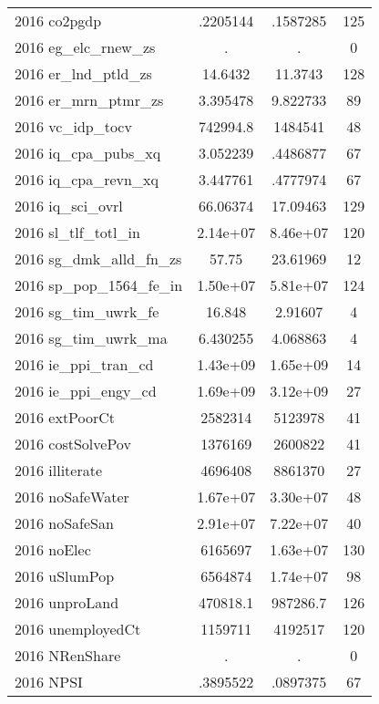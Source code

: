{\begin{tabular}{l*{1}{ccc}}
2016 co2pgdp        &    .2205144&    .1587285&         125\\
2016 eg\_elc\_rnew\_zs &           .&           .&           0\\
2016 er\_lnd\_ptld\_zs &     14.6432&     11.3743&         128\\
2016 er\_mrn\_ptmr\_zs &    3.395478&    9.822733&          89\\
2016 vc\_idp\_tocv    &    742994.8&     1484541&          48\\
2016 iq\_cpa\_pubs\_xq &    3.052239&    .4486877&          67\\
2016 iq\_cpa\_revn\_xq &    3.447761&    .4777974&          67\\
2016 iq\_sci\_ovrl    &    66.06374&    17.09463&         129\\
2016 sl\_tlf\_totl\_in &    2.14e+07&    8.46e+07&         120\\
2016 sg\_dmk\_alld\_fn\_zs&       57.75&    23.61969&          12\\
2016 sp\_pop\_1564\_fe\_in&    1.50e+07&    5.81e+07&         124\\
2016 sg\_tim\_uwrk\_fe &      16.848&     2.91607&           4\\
2016 sg\_tim\_uwrk\_ma &    6.430255&    4.068863&           4\\
2016 ie\_ppi\_tran\_cd &    1.43e+09&    1.65e+09&          14\\
2016 ie\_ppi\_engy\_cd &    1.69e+09&    3.12e+09&          27\\
2016 extPoorCt      &     2582314&     5123978&          41\\
2016 costSolvePov   &     1376169&     2600822&          41\\
2016 illiterate     &     4696408&     8861370&          27\\
2016 noSafeWater    &    1.67e+07&    3.30e+07&          48\\
2016 noSafeSan      &    2.91e+07&    7.22e+07&          40\\
2016 noElec         &     6165697&    1.63e+07&         130\\
2016 uSlumPop       &     6564874&    1.74e+07&          98\\
2016 unproLand      &    470818.1&    987286.7&         126\\
2016 unemployedCt   &     1159711&     4192517&         120\\
2016 NRenShare      &           .&           .&           0\\
2016 NPSI           &    .3895522&    .0897375&          67\\

\end{tabular}}
